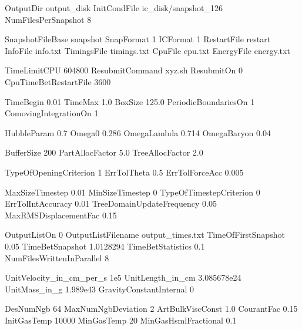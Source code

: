 OutputDir                       output_disk
InitCondFile                    ic_disk/snapshot_126
NumFilesPerSnapshot             8%

SnapshotFileBase                snapshot
SnapFormat                      1
ICFormat                        1
RestartFile                     restart
InfoFile                        info.txt
TimingsFile                     timings.txt
CpuFile                         cpu.txt
EnergyFile                      energy.txt

TimeLimitCPU                    604800
ResubmitCommand                 xyz.sh
ResubmitOn                      0
CpuTimeBetRestartFile           3600

TimeBegin                       0.01
TimeMax                         1.0
BoxSize                         125.0
PeriodicBoundariesOn            1
ComovingIntegrationOn           1

HubbleParam                     0.7
Omega0                          0.286
OmegaLambda                     0.714
OmegaBaryon                     0.04         %

BufferSize                      200
PartAllocFactor                 5.0
TreeAllocFactor                 2.0

TypeOfOpeningCriterion          1
ErrTolTheta                     0.5
ErrTolForceAcc                  0.005

MaxSizeTimestep                 0.01
MinSizeTimestep                 0
TypeOfTimestepCriterion         0            %
ErrTolIntAccuracy               0.01
TreeDomainUpdateFrequency       0.05
MaxRMSDisplacementFac           0.15

OutputListOn                    0
OutputListFilename              output_times.txt
TimeOfFirstSnapshot             0.05
TimeBetSnapshot                 1.0128294
TimeBetStatistics               0.1
NumFilesWrittenInParallel       8%

UnitVelocity_in_cm_per_s        1e5
UnitLength_in_cm                3.085678e24  %
UnitMass_in_g                   1.989e43
GravityConstantInternal         0

DesNumNgb                       64
MaxNumNgbDeviation              2
ArtBulkViscConst                1.0
CourantFac                      0.15
InitGasTemp                     10000
MinGasTemp                      20
MinGasHsmlFractional            0.1

